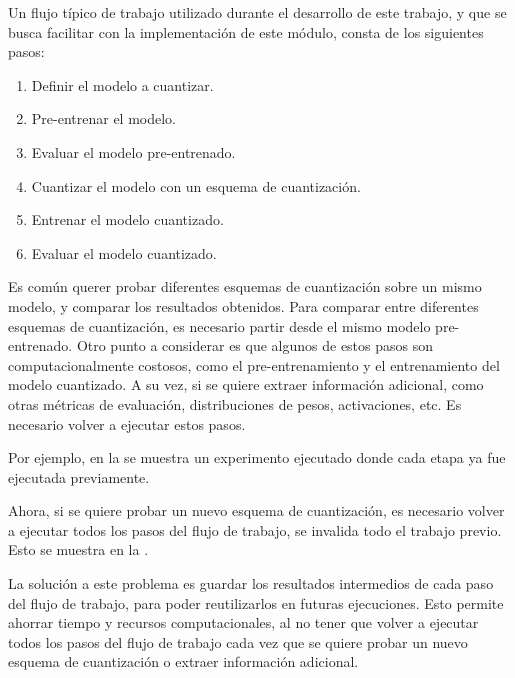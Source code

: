 Un flujo típico de trabajo utilizado durante el desarrollo de este trabajo, y que se busca facilitar con la implementación de este módulo, consta de los siguientes pasos:

\begin{enumerate}
    \item Definir el modelo a cuantizar.
    \item Pre-entrenar el modelo.
    \item Evaluar el modelo pre-entrenado.
    \item Cuantizar el modelo con un esquema de cuantización.
    \item Entrenar el modelo cuantizado.
    \item Evaluar el modelo cuantizado.
\end{enumerate}

Es común querer probar diferentes esquemas de cuantización sobre un mismo modelo, y comparar los resultados obtenidos. Para comparar entre diferentes esquemas de cuantización, es necesario partir desde el mismo modelo pre-entrenado. Otro punto a considerar es que algunos de estos pasos son computacionalmente costosos, como el pre-entrenamiento y el entrenamiento del modelo cuantizado. A su vez, si se quiere extraer información adicional, como otras métricas de evaluación, distribuciones de pesos, activaciones, etc. Es necesario volver a ejecutar estos pasos.

Por ejemplo, en la  se muestra un experimento ejecutado donde cada etapa ya fue ejecutada previamente.


Ahora, si se quiere probar un nuevo esquema de cuantización, es necesario volver a ejecutar todos los pasos del flujo de trabajo, se invalida todo el trabajo previo. Esto se muestra en la .


La solución a este problema es guardar los resultados intermedios de cada paso del flujo de trabajo, para poder reutilizarlos en futuras ejecuciones. Esto permite ahorrar tiempo y recursos computacionales, al no tener que volver a ejecutar todos los pasos del flujo de trabajo cada vez que se quiere probar un nuevo esquema de cuantización o extraer información adicional.

